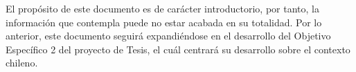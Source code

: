 El propósito de este documento es de carácter introductorio, por tanto, la información que contempla
puede no estar acabada en su totalidad. Por lo anterior, este documento seguirá expandiéndose en el
desarrollo del Objetivo Específico 2 del proyecto de Tesis, el cuál centrará su desarrollo sobre el
contexto chileno.
